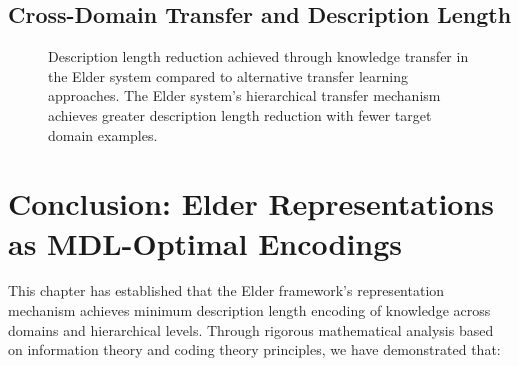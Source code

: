 \subsection{Cross-Domain Transfer and Description Length}

\begin{figure}[h]
\centering
{}
\caption{Description length reduction achieved through knowledge transfer in the Elder system compared to alternative transfer learning approaches. The Elder system's hierarchical transfer mechanism achieves greater description length reduction with fewer target domain examples.}
\label{fig:transfer_mdl}
\end{figure}

\section{Conclusion: Elder Representations as MDL-Optimal Encodings}

This chapter has established that the Elder framework's representation mechanism achieves minimum description length encoding of knowledge across domains and hierarchical levels. Through rigorous mathematical analysis based on information theory and coding theory principles, we have demonstrated that:

